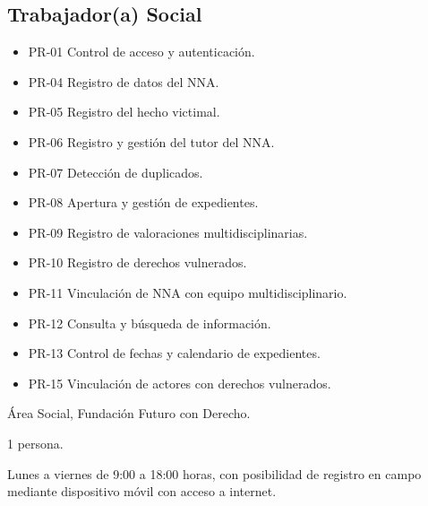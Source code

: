 \begin{Usuario}{\hypertarget{A.TrabajadorSocial}{\hypertarget{Actor.Especialista}{\subsection{Trabajador(a) Social}}}}
	\item[Procesos en los que participa:] \cdtEmpty
	\begin{itemize}
		\item PR-01 Control de acceso y autenticación.
		\item PR-04 Registro de datos del NNA.
		\item PR-05 Registro del hecho victimal.
		\item PR-06 Registro y gestión del tutor del NNA.
		\item PR-07 Detección de duplicados.
		\item PR-08 Apertura y gestión de expedientes.
		\item PR-09 Registro de valoraciones multidisciplinarias.
		\item PR-10 Registro de derechos vulnerados.
		\item PR-11 Vinculación de NNA con equipo multidisciplinario.
		\item PR-12 Consulta y búsqueda de información.
		\item PR-13 Control de fechas y calendario de expedientes.
		\item PR-15 Vinculación de actores con derechos vulnerados.
	\end{itemize}
	
	\item[Área:] Área Social, Fundación Futuro con Derecho.
	\item[Cantidad aproximada:] 1 persona.
	\item[Horario de actividad:] Lunes a viernes de 9:00 a 18:00 horas, 
	con posibilidad de registro en campo mediante dispositivo móvil 
	con acceso a internet.
\end{Usuario}

